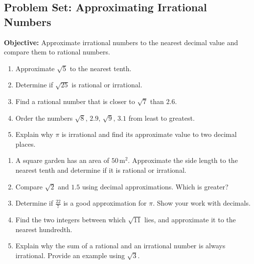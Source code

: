 \documentclass[12pt]{article}
\title{}
\date{}
\begin{document}
\subsection*{Problem Set: Approximating Irrational Numbers}
\onehalfspacing

\begin{tcolorbox}[colframe=black!40, colback=gray!5, 
coltitle=black, colbacktitle=black!20, fonttitle=\bfseries\Large, 
title=Learning Objective, halign title=center, left=5pt, right=5pt, top=5pt, bottom=15pt]
\textbf{Objective:} Approximate irrational numbers to the nearest decimal value and compare them to rational numbers.
\end{tcolorbox}

\begin{tcolorbox}[colframe=black!60, colback=white, 
coltitle=black, colbacktitle=black!15, fonttitle=\bfseries\Large, 
title=Exercises, halign title=center, left=10pt, right=10pt, top=10pt, bottom=60pt]
\begin{enumerate}[itemsep=3em]
    \item Approximate \( \sqrt{5} \) to the nearest tenth.
    \item Determine if \( \sqrt{25} \) is rational or irrational.
    \item Find a rational number that is closer to \( \sqrt{7} \) than \( 2.6 \).
    \item Order the numbers \( \sqrt{8}, \, 2.9, \, \sqrt{9}, \, 3.1 \) from least to greatest.
    \item Explain why \( \pi \) is irrational and find its approximate value to two decimal places.
\end{enumerate}
\end{tcolorbox}

\vspace{1em}

\begin{tcolorbox}[colframe=black!60, colback=white, 
coltitle=black, colbacktitle=black!15, fonttitle=\bfseries\Large, 
title=Problems, halign title=center, left=10pt, right=10pt, top=10pt, bottom=60pt]
\begin{enumerate}[start=6, itemsep=5em]
    \item A square garden has an area of \( 50 \, \text{m}^2 \). Approximate the side length to the nearest tenth and determine if it is rational or irrational.
    \item Compare \( \sqrt{2} \) and \( 1.5 \) using decimal approximations. Which is greater?
    \item Determine if \( \frac{22}{7} \) is a good approximation for \( \pi \). Show your work with decimals.
    \item Find the two integers between which \( \sqrt{11} \) lies, and approximate it to the nearest hundredth.
    \item Explain why the sum of a rational and an irrational number is always irrational. Provide an example using \( \sqrt{3} \).
\end{enumerate}
\end{tcolorbox}
\end{document}
